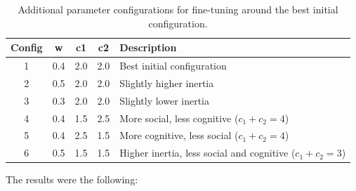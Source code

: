 \documentclass[12pt,a4paper]{article}
\begin{document}
\begin{itemize}
         \begin{table}[H]
                \centering
                \begin{tabular}{c c c c l}
                \hline
                \textbf{Config} & \textbf{w} & \textbf{c1} & \textbf{c2} & \textbf{Description} \\
                \hline
                1 & 0.4 & 2.0 & 2.0 & Best initial configuration \\
                2 & 0.5 & 2.0 & 2.0 & Slightly higher inertia \\
                3 & 0.3 & 2.0 & 2.0 & Slightly lower inertia \\
                4 & 0.4 & 1.5 & 2.5 & More social, less cognitive ($c_1 + c_2 = 4$) \\
                5 & 0.4 & 2.5 & 1.5 & More cognitive, less social ($c_1 + c_2 = 4$) \\
                6 & 0.5 & 1.5 & 1.5 & Higher inertia, less social and cognitive ($c_1 + c_2 = 3$) \\
                \hline
                \end{tabular}
                \caption{Additional parameter configurations for fine-tuning around the best initial configuration.}
            \end{table}
        
       
        
            
            The results were the following: 


\end{itemize}
\end{document}
